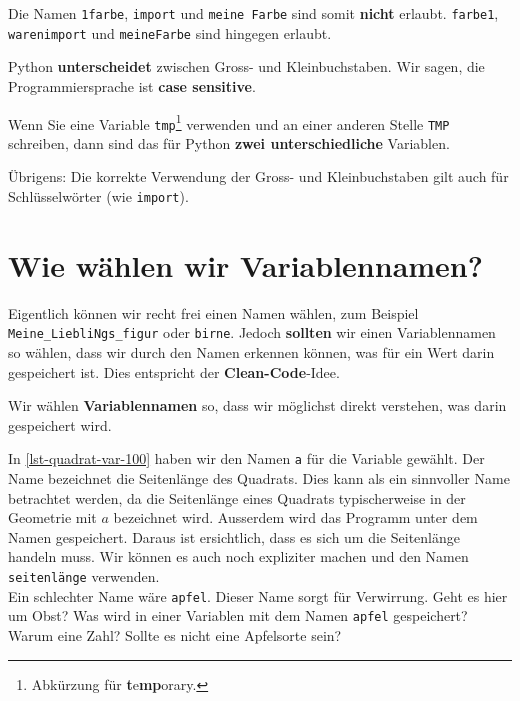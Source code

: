 Die Namen \lstinline{1farbe}, \lstinline{import} und \lstinline{meine Farbe} sind somit \textbf{nicht} erlaubt. \lstinline{farbe1}, \lstinline{warenimport} und \lstinline{meineFarbe} sind hingegen erlaubt.

\begin{important}
Python \textbf{unterscheidet} zwischen Gross- und Kleinbuchstaben. Wir sagen, die Programmiersprache ist \textbf{case sensitive}.
\end{important}

\begin{example}
	Wenn Sie eine Variable \lstinline{tmp}\footnote{Abkürzung für \textbf{t}e\textbf{mp}orary.} verwenden und an einer anderen Stelle \lstinline{TMP} schreiben, dann sind das für Python \textbf{zwei unterschiedliche} Variablen. 
\end{example}

Übrigens: Die korrekte Verwendung der Gross- und Kleinbuchstaben gilt auch für Schlüsselwörter (wie \lstinline{import}).

\section{Wie wählen wir Variablennamen?}

Eigentlich können wir recht frei einen Namen wählen, zum Beispiel \lstinline{Meine_LiebliNgs_figur} oder \lstinline{birne}. Jedoch \textbf{sollten} wir einen Variablennamen so wählen, dass wir durch den Namen erkennen können, was für ein Wert darin gespeichert ist. Dies entspricht der \textbf{Clean-Code}-Idee.

\begin{cleancode}
Wir wählen \textbf{Variablennamen} so, dass wir möglichst direkt verstehen, was darin gespeichert wird.
\end{cleancode}

\begin{example}
In \autoref{lst-quadrat-var-100} haben wir den Namen \lstinline{a} für die Variable gewählt. Der Name bezeichnet die Seitenlänge des Quadrats. Dies kann als ein sinnvoller Name betrachtet werden, da die Seitenlänge eines Quadrats typischerweise in der Geometrie mit $a$ bezeichnet wird. Ausserdem wird das Programm unter dem Namen  gespeichert. Daraus ist ersichtlich, dass es sich um die Seitenlänge handeln muss. Wir können es auch noch expliziter machen und den Namen \lstinline{seitenlänge} verwenden.\\
Ein schlechter Name wäre \lstinline{apfel}. Dieser Name sorgt für Verwirrung. Geht es hier um Obst? Was wird in einer Variablen mit dem Namen \lstinline{apfel} gespeichert? Warum eine Zahl? Sollte es nicht eine Apfelsorte sein?
\end{example}


